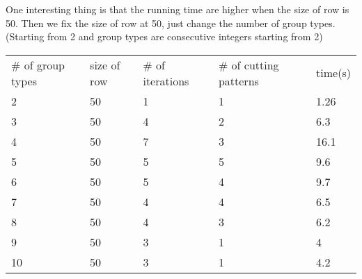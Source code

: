 One interesting thing is that the running time are higher when the size of row is 50. Then we fix the size of row at 50, just change the number of group types. (Starting from 2 and group types are consecutive integers starting from 2)

\begin{table}[ht]
  \begin{tabular}{l|l|l|l|l}
  \hline
  \# of group types & size of row & \# of iterations & \# of cutting patterns & time(s) \\
  2  & 50  & 1 & 1 & 1.26 \\
  3  & 50  & 4 & 2 & 6.3 \\
  4  & 50  & 7 & 3 & 16.1 \\
  5  & 50  & 5 & 5 & 9.6 \\
  6  & 50  & 5 & 4 & 9.7 \\
  7  & 50  & 4 & 4 & 6.5 \\
  8  & 50 & 4 & 3 & 6.2 \\
  9  & 50 & 3 & 1 & 4 \\
  10 & 50 & 3 & 1 & 4.2 \\
  \hline
  \end{tabular}
\end{table}






